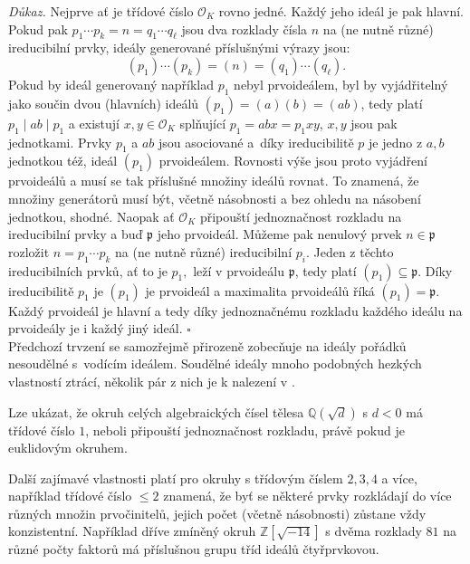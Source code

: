 \documentclass[12pt]{report}
\begin{document}
\noindent \textit{Důkaz.} Nejprve ať je třídové číslo $\mathcal{O}_K$ rovno jedné. Každý jeho ideál je pak hlavní. Pokud pak $p_1 \cdots p_k = n = q_1 \cdots q_{\ell}$ jsou dva rozklady čísla $n$ na (ne nutně různé) ireducibilní prvky, ideály generované příslušnými výrazy jsou:
\begin{equation*}
(p_1) \cdots (p_k) = (n) = (q_1) \cdots (q_\ell).
\end{equation*}
Pokud by ideál generovaný například $p_1$ nebyl prvoideálem, byl by vyjádřitelný jako součin dvou (hlavních) ideálů $(p_1) = (a)(b) = (ab)$, tedy platí $p_1 \mid ab \mid p_1$ a existují $x,y \in \mathcal{O}_K$ splňující $p_1 = abx = p_1 xy$, $x,y$ jsou pak jednotkami. Prvky $p_1$ a $ab$ jsou asociované a~díky ireducibilitě $p$ je jedno z $a,b$ jednotkou též, ideál $(p_1)$ prvoideálem. Rovnosti výše jsou proto vyjádření prvoideálů a musí se tak příslušné množiny ideálů rovnat. To znamená, že množiny generátorů musí být, včetně násobnosti a bez ohledu na násobení jednotkou, shodné. Naopak ať $\mathcal{O}_K$ připouští jednoznačnost rozkladu na ireducibilní prvky a buď $\mathfrak{p}$ jeho prvoideál. Můžeme pak nenulový prvek $n \in \mathfrak{p}$ rozložit $n = p_1 \cdots p_k$  na (ne nutně různé) ireducibilní $p_i$. Jeden z těchto ireducibilních prvků, ať to je $p_1,$ leží v prvoideálu $\mathfrak{p}$, tedy platí $(p_1) \subseteq \mathfrak{p}$. Díky ireducibilitě $p_1$ je $(p_1)$ je prvoideál a maximalita prvoideálů říká $(p_1) = \mathfrak{p}$. Každý prvoideál je hlavní a tedy díky jednoznačnému rozkladu každého ideálu na prvoideály je i každý jiný ideál. \hfill $\square$\\

Předchozí trvzení se samozřejmě přirozeně zobecňuje na ideály pořádků nesoudělné s~vodícím ideálem. Soudělné ideály mnoho podobných hezkých vlastností ztrácí, několik pár z nich je k nalezení v \cite[Ch. 3.]{Conrad3}.

\begin{poznamka}
Lze ukázat, že okruh celých algebraických čísel tělesa $\mathbb{Q}(\sqrt{d})$ s $d < 0$ má třídové číslo $1$, neboli připouští jednoznačnost rozkladu, právě pokud je euklidovým okruhem.
\end{poznamka}

Další zajímavé vlastnosti platí pro okruhy s třídovým číslem $2,3,4$ a více, například třídové číslo $\leqslant 2$ znamená, že byť se některé prvky rozkládají do více různých množin prvočinitelů, jejich počet (včetně násobnosti) zůstane vždy konzistentní. Například dříve zmíněný okruh $\mathbb{Z}[\sqrt{-14}]$ s dvěma rozklady $81$ na různé počty faktorů má příslušnou grupu tříd ideálů čtyřprvkovou.
\end{document}
